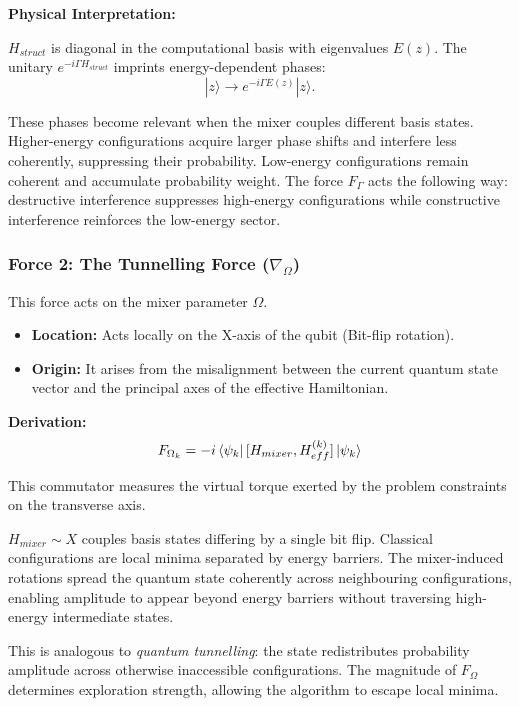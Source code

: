 \documentclass[12pt, a4paper, oneside]{report}
\begin{document}
\textbf{Physical Interpretation:}

$H_{struct}$ is diagonal in the computational basis with eigenvalues $E(z)$. The unitary $e^{-i\Gamma H_{struct}}$ imprints energy-dependent phases:
\begin{equation}
|z\rangle \rightarrow e^{-i\Gamma E(z)}|z\rangle .
\end{equation}

These phases become relevant when the mixer couples different basis states. Higher-energy configurations acquire larger phase shifts and interfere less coherently, suppressing their probability. Low-energy configurations remain coherent and accumulate probability weight. The force $F_\Gamma$ acts the following way: destructive interference suppresses high-energy configurations while constructive interference reinforces the low-energy sector.

\subsubsection{Force 2: The Tunnelling Force ($\nabla_\Omega$)}
This force acts on the mixer parameter $\Omega$.
\begin{itemize}
    \item \textbf{Location:} Acts locally on the X-axis of the qubit (Bit-flip rotation).
    \item \textbf{Origin:} It arises from the misalignment between the current quantum state vector and the principal axes of the effective Hamiltonian.
\end{itemize}

\textbf{Derivation:}
\begin{equation}
    F_{\Omega_k} = -i \bra{\psi_{k}} [H_{mixer}, H_{eff}^{(k)}] \ket{\psi_{k}}
\end{equation}

This commutator measures the virtual torque exerted by the problem constraints on the transverse axis.

$H_{mixer} \sim X$ couples basis states differing by a single bit flip. Classical configurations are local minima separated by energy barriers. The mixer-induced rotations spread the quantum state coherently across neighbouring configurations, enabling amplitude to appear beyond energy barriers without traversing high-energy intermediate states.

This is analogous to \textit{quantum tunnelling}: the state redistributes probability amplitude across otherwise inaccessible configurations. The magnitude of $F_\Omega$ determines exploration strength, allowing the algorithm to escape local minima.
\end{document}
